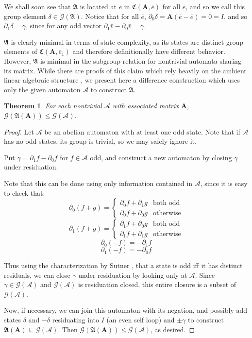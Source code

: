 \documentclass[runningheads]{llncs}
\newcommand{\A}{\mathcal{A}}
\newcommand{\G}{\mathcal{G}}
\renewcommand{\P}{\mathfrak{A}}
\newcommand{\C}{\mathfrak{C}(\Am,\e)}
\newcommand{\2}{\textbf{2}}
\newcommand{\Am}{\textbf{A}}
\newcommand{\del}{\partial}
\renewcommand{\v}{\bar{v}}
\newcommand{\e}{\bar{e}}
\newtheorem{thm}{Theorem}
\begin{document}
We shall soon see that $\P$ is located at $\e$ in $\C$ for all $\e$,
and so we call this group element $\delta \in \G(\P)$. Notice that for
all $\e$, $\del_0 \delta = \Am(\e - \e) = \bar{0} = I$, and so
$\del_1 \delta = \gamma$, since for any odd vector 
$\del_1 \v - \del_0 \v = \gamma$.

$\P$ is clearly minimal in terms of state complexity, as its states are
distinct group elements of $\mathfrak{C}(\Am, \e_1)$ and therefore 
definitionally have different behavior. However, $\P$ is minimal in the
subgroup relation for nontrivial automata sharing its matrix. 
While there are proofs of this claim which rely heavily on the
ambient linear algebraic structure \cite{Okano15:thesis}, 
we present here a difference construction which uses only the given 
automaton $\A$ to construct $\P$.

\begin{thm}
  For each nontrivial $\A$ with associated matrix $\Am$,\\
  $\G(\P(\Am)) \leq \G(\A)$.
\end{thm}

\begin{proof}
  Let $\A$ be an abelian automaton with at least one odd state.
  Note that if $\A$ has no odd states, its group is trivial, so we may
  safely ignore it.

  Put $\gamma = \del_1 f - \del_0 f$ for $f \in \A$ odd, and construct
  a new automaton by closing $\gamma$ under residuation.

  Note that this can be done using only information contained in $\A$,
  since it is easy to check that:
  \[
    \del_0(f + g) = \begin{cases} \del_0 f + \del_1 g & \text{both odd}\\
                                  \del_0 f + \del_0 g & \text{otherwise}
                    \end{cases}
  \]
  \[
    \del_1(f + g) = \begin{cases} \del_1 f + \del_0 g & \text{both odd}\\
                                  \del_1 f + \del_1 g & \text{otherwise}
                    \end{cases}
  \]
  \[
    \del_0 (-f) = - \del_1 f
  \]
  \[
    \del_1 (-f) = - \del_0 f
  \]

  Thus using the characterization by Sutner \cite{Sutner18:abelian_automata}, 
  that a state is odd iff it has distinct residuals, we can close $\gamma$ 
  under residuation by looking only at $\A$.
  Since $\gamma \in \G(\A)$ and $\G(\A)$ is residuation closed, 
  this entire closure is a subset of $\G(\A)$. 

  Now, if necessary, we can join this automaton with its negation, and
  possibly add states $\delta$ and $-\delta$ residuating into $I$
  (an even self loop) and $\pm \gamma$ to construct 
  $\P(\Am) \subseteq \G(\A)$. Then $\G(\P(\Am)) \leq \G(\A)$, as desired.
\end{proof}
\end{document}
